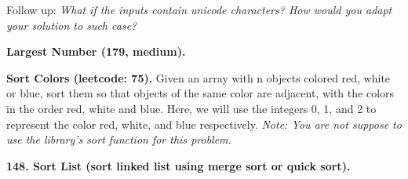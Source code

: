 \documentclass[../main.tex]{subfiles}
\begin{document}
\begin{examples}
Follow up: \textit{What if the inputs contain unicode characters? How would you adapt your solution to such case?}

\item \textbf{Largest Number (179, medium).}

\item \textbf{Sort Colors (leetcode: 75).} Given an array with n objects colored red, white or blue, sort them so that objects of the same color are adjacent, with the colors in the order red, white and blue. Here, we will use the integers 0, 1, and 2 to represent the color red, white, and blue respectively.
\textit{Note: You are not suppose to use the library's sort function for this problem.}

\item \textbf{ 
148. Sort List (sort linked list using merge sort or quick sort).}
\end{examples}
\end{document}
